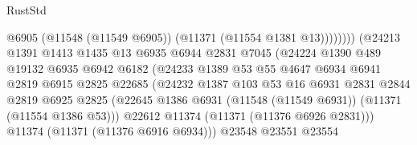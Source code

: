 \begin{lexlean}{RustStd}
\begin{coremodule}
                                              @6905
                                              (@11548 (@11549 @6905))
                                              (@11371 (@11554 @1381 @13))))))))
                                  (@24213
                                    @1391
                                    @1413
                                    @1435
                                    @13
                                    @6935
                                    @6944
                                    @2831
                                    @7045
                                    (@24224
                                      @1390
                                      @489
                                      @19132
                                      @6935
                                      @6942
                                      @6182
                                      (@24233
                                        @1389
                                        @53
                                        @55
                                        @4647
                                        @6934
                                        @6941
                                        @2819
                                        @6915
                                        @2825
                                        @22685
                                        (@24232
                                          @1387
                                          @103
                                          @53
                                          @16
                                          @6931
                                          @2831
                                          @2844
                                          @2819
                                          @6925
                                          @2825
                                          (@22645
                                            @1386
                                            @6931
                                            (@11548 (@11549 @6931))
                                            (@11371 (@11554 @1386 @53)))
                                          @22612
                                          @11374
                                          (@11371 (@11376 @6926 @2831)))
                                        @11374
                                        (@11371 (@11376 @6916 @6934)))
                                      @23548
                                      @23551
                                      @23554

\end{coremodule}
\end{lexlean}
